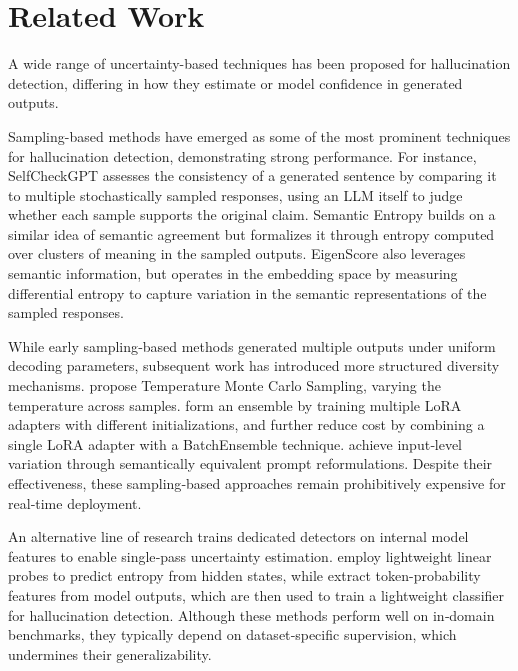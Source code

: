 \documentclass[letterpaper]{article} %
\begin{document}
\section{Related Work}
A wide range of uncertainty-based techniques has been proposed for hallucination detection, differing in how they estimate or model confidence in generated outputs.

Sampling-based methods have emerged as some of the most prominent techniques for hallucination detection, demonstrating strong performance. For instance, SelfCheckGPT \cite{manakul2023selfcheckgptzeroresourceblackboxhallucination} assesses the consistency of a generated sentence by comparing it to multiple stochastically sampled responses, using an LLM itself to judge whether each sample supports the original claim. Semantic Entropy \cite{kuhn2023semanticuncertaintylinguisticinvariances} builds on a similar idea of semantic agreement but formalizes it through entropy computed over clusters of meaning in the sampled outputs. EigenScore \cite{chen2024insidellmsinternalstates} also leverages semantic information, but operates in the embedding space by measuring differential entropy to capture variation in the semantic representations of the sampled responses.

While early sampling‐based methods generated multiple outputs under uniform decoding parameters, subsequent work has introduced more structured diversity mechanisms. \citet{cecere2025montecarlotemperaturerobust} propose Temperature Monte Carlo Sampling, varying the temperature across samples. \citet{balabanov2025uncertainty} form an ensemble by training multiple LoRA adapters with different initializations, and \citet{arteaga2024hallucination} further reduce cost by combining a single LoRA adapter with a BatchEnsemble technique. \citet{zhang2024vluncertaintydetectinghallucinationlarge} achieve input‐level variation through semantically equivalent prompt reformulations. Despite their effectiveness, these sampling‐based approaches remain prohibitively expensive for real‐time deployment.

An alternative line of research trains dedicated detectors on internal model features to enable single‑pass uncertainty estimation. \citet{kossen2024semanticentropyprobesrobust} employ lightweight linear probes to predict entropy from hidden states, while \citet{quevedo2024detectinghallucinationslargelanguage} extract token-probability features from model outputs, which are then used to train a lightweight classifier for hallucination detection. Although these methods perform well on in‑domain benchmarks, they typically depend on dataset‑specific supervision, which undermines their generalizability.
\end{document}
